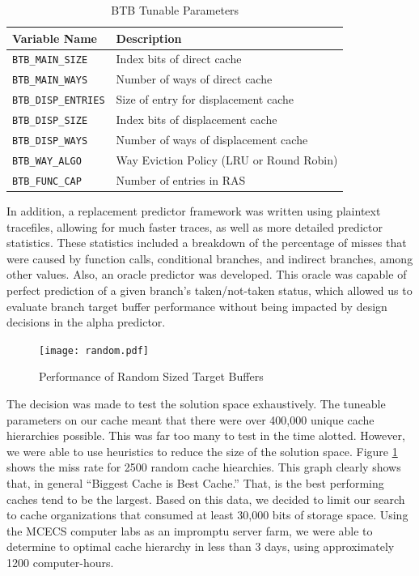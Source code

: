 \documentclass[twocolumn]{article}
\newcommand{\centerimage}[3]{
\begin{figure}[ht!]  
\begin{center} #1
\caption{#2}
\label{#3}
\end{center}
\end{figure}}
\begin{document}
\begin{table}
\begin{center}\begin{tabular}{p{}p{}}
Variable Name & Description \\
\hline
\texttt{BTB\_MAIN\_SIZE} & Index bits of direct cache \\
\texttt{BTB\_MAIN\_WAYS} & Number of ways of direct cache \\
\texttt{BTB\_DISP\_ENTRIES} & Size of entry for displacement cache \\
\texttt{BTB\_DISP\_SIZE} & Index bits of displacement cache \\
\texttt{BTB\_DISP\_WAYS} & Number of ways of displacement cache \\
\texttt{BTB\_WAY\_ALGO} & Way Eviction Policy (LRU or Round Robin) \\
\texttt{BTB\_FUNC\_CAP} & Number of entries in RAS
\end{tabular}\end{center}
\caption{BTB Tunable Parameters}
\label{envars}
\end{table}

In addition, a replacement predictor framework was written using
plaintext tracefiles, allowing for much faster traces, as well as more
detailed predictor statistics. These statistics included a breakdown
of the percentage of misses that were caused by function calls,
conditional branches, and indirect branches, among other values. Also,
an oracle predictor was developed. This oracle was capable of perfect
prediction of a given branch's taken/not-taken status, which allowed
us to evaluate branch target buffer performance without being impacted
by design decisions in the alpha predictor. 

\centerimage{\texttt{[image: random.pdf]}}{Performance
  of Random Sized Target Buffers}{bgraph}

The decision was made to test the solution space exhaustively. The
tuneable parameters on our cache meant that there were over 400,000
unique cache hierarchies possible. This was far too many to test in
the time alotted. However, we were able to use heuristics to reduce
the size of the solution space. Figure \ref{bgraph} shows the miss
rate for 2500 random cache hiearchies. This graph clearly shows that,
in general ``Biggest Cache is Best Cache.'' That, is the best
performing caches tend to be the largest. Based on this data, we
decided to limit our search to cache organizations that consumed at
least 30,000 bits of storage space. Using the MCECS computer labs as
an impromptu server farm, we were able to determine to optimal cache
hierarchy in less than 3 days, using approximately 1200
computer-hours. 
\end{document}
